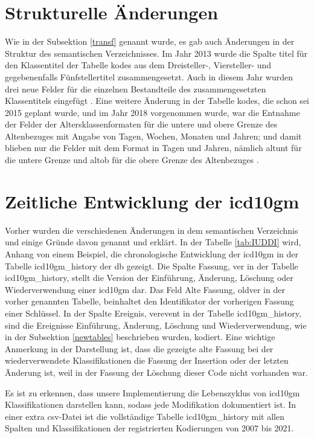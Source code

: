 \section{Strukturelle Änderungen}

Wie in der Subsektion \ref{transf} genannt wurde, es gab auch Änderungen in der Struktur des semantischen Verzeichnisses. Im Jahr 2013 wurde die Spalte \textsf{titel} für den Klassentitel der Tabelle \textsf{kodes} aus dem Dreisteller-, Viersteller- und gegebenenfalls Fünfstellertitel zusammengesetzt. Auch in diesem Jahr wurden drei neue Felder für die einzelnen Bestandteile des zusammengesetzten Klassentitels eingefügt \cite{readme13}. Eine weitere Änderung in der Tabelle \textsf{kodes}, die schon sei 2015 geplant wurde, und im Jahr 2018 vorgenommen wurde, war die Entnahme der Felder der Altersklassenformaten für die untere und obere Grenze des Altenbezuges mit Angabe von Tagen, Wochen, Monaten und Jahren; und damit blieben nur die Felder mit dem Format in Tagen und Jahren, nämlich  \textsf{altunt} für die untere Grenze und \textsf{altob} für die obere Grenze des Altenbezuges \cite{readme17}.

\section{Zeitliche Entwicklung der \acs{icd10gm}}

Vorher wurden die verschiedenen Änderungen in dem semantischen Verzeichnis und einige Gründe davon genannt und erklärt. In der Tabelle \ref{tab:IUDDI} wird, Anhang von einem Beispiel, die chronologische Entwicklung der \ac{icd10gm} in der Tabelle \textsf{icd10gm\_history} der \ac{db} gezeigt. Die Spalte Fassung, \textsf{ver} in der Tabelle \textsf{icd10gm\_history}, stellt die Version der Einführung, Änderung, Löschung oder Wiederverwendung einer \ac{icd10gm} dar. Das Feld Alte Fassung, \textsf{oldver} in der vorher genannten Tabelle, beinhaltet den Identifikator der vorherigen Fassung einer Schlüssel. In der Spalte Ereignis, \textsf{verevent} in der Tabelle \textsf{icd10gm\_history}, sind die Ereignisse Einführung, Änderung, Löschung und Wiederverwendung, wie in der Subsektion \ref{newtables} beschrieben wurden, kodiert. Eine wichtige Anmerkung in der Darstellung ist, dass die gezeigte alte Fassung bei der wiederverwendete Klassifikationen die Fassung der Insertion oder der letzten Änderung ist, weil in der Fassung der Löschung dieser Code nicht vorhanden war.

Es ist zu erkennen, dass unsere Implementierung die Lebenszyklus von \ac{icd10gm} Klassifikationen darstellen kann, sodass jede Modifikation dokumentiert ist. In einer extra \ac{csv}-Datei ist die vollständige Tabelle \textsf{icd10gm\_history} mit allen Spalten und Klassifikationen der registrierten Kodierungen von 2007 bis 2021.

